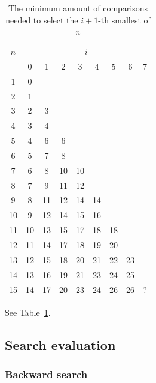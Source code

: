 \documentclass[10pt,journal,compsoc]{IEEEtran}
\begin{document}
\begin{table}
  \centering
  \begin{tabular}{c|cccccccc}
    $n$ & \multicolumn{8}{c}{$i$}                                   \\
        & 0                       & 1  & 2  & 3  & 4  & 5  & 6  & 7 \\ \hline
    1   & 0                                                         \\
    2   & 1                                                         \\
    3   & 2                       & 3                               \\
    4   & 3                       & 4                               \\
    5   & 4                       & 6  & 6                          \\
    6   & 5                       & 7  & 8                          \\
    7   & 6                       & 8  & 10 & 10                    \\
    8   & 7                       & 9  & 11 & 12                    \\
    9   & 8                       & 11 & 12 & 14 & 14               \\
    10  & 9                       & 12 & 14 & 15 & 16               \\
    11  & 10                      & 13 & 15 & 17 & 18 & 18          \\
    12  & 11                      & 14 & 17 & 18 & 19 & 20          \\
    13  & 12                      & 15 & 18 & 20 & 21 & 22 & 23     \\
    14  & 13                      & 16 & 19 & 21 & 23 & 24 & 25     \\
    15  & 14                      & 17 & 20 & 23 & 24 & 26 & 26 & ? \\
  \end{tabular}
  \caption{The minimum amount of comparisons needed to select the $i+1$-th smallest of $n$}
  \label{table:num-comparisons}
\end{table}

See Table~\ref{table:num-comparisons}.


\subsection{Search evaluation}
\subsubsection{Backward search}
\end{document}
